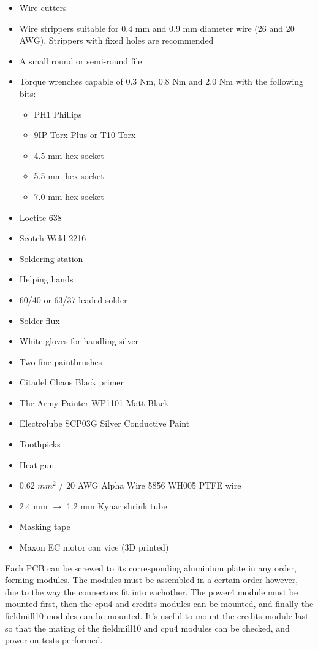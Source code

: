 \documentclass{article}
\begin{document}
\begin{itemize}
\item Wire cutters
\item Wire strippers suitable for 0.4 mm and 0.9 mm diameter wire (26 and 20 AWG). Strippers with fixed holes are recommended
\item A small round or semi-round file
\item Torque wrenches capable of 0.3 Nm, 0.8 Nm and 2.0 Nm with the following bits:
\begin{itemize}
\item PH1 Phillips
\item 9IP Torx-Plus or T10 Torx
\item 4.5 mm hex socket
\item 5.5 mm hex socket
\item 7.0 mm hex socket
\end{itemize}
\item Loctite 638
\item Scotch-Weld 2216
\item Soldering station
\item Helping hands
\item 60/40 or 63/37 leaded solder
\item Solder flux
\item White gloves for handling silver
\item Two fine paintbrushes
\item Citadel Chaos Black primer
\item The Army Painter WP1101 Matt Black
\item Electrolube SCP03G Silver Conductive Paint
\item Toothpicks
\item Heat gun
\item 0.62 $mm^2$ / 20 AWG Alpha Wire 5856 WH005 PTFE wire
\item 2.4 mm $\rightarrow$ 1.2 mm Kynar shrink tube
\item Masking tape
\item Maxon EC motor can vice (3D printed)
\end{itemize}

Each PCB can be screwed to its corresponding aluminium plate in any order, forming modules.
The modules must be assembled in a certain order however,
due to the way the connectors fit into eachother.
The power4 module must be mounted first,
then the cpu4 and credits modules can be mounted, and finally the fieldmill10 modules can be mounted.
It's useful to mount the credits module last so that the mating of the fieldmill10 and cpu4 modules can be checked,
and power-on tests performed.
\end{document}
